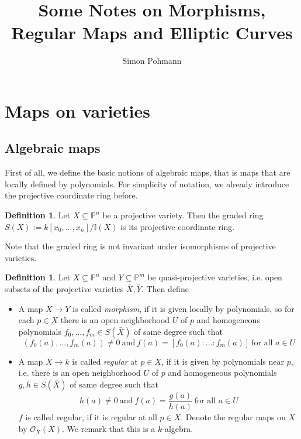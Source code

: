 \documentclass{scrartcl}
\title{Some Notes on Morphisms, Regular Maps and Elliptic Curves}
\author{Simon Pohmann}
\newcommand{\I}{\mathbb{I}}
\theoremstyle{definition}
\newtheorem{definition}[prop]{Definition}
\begin{document}
\maketitle

\tableofcontents

\section{Maps on varieties}

\subsection{Algebraic maps}
First of all, we define the basic notions of algebraic maps, that is maps that are locally defined by polynomials.
For simplicity of notation, we already introduce the projective coordinate ring before.
\begin{definition}
    Let $X \subseteq \mathbb{P}^n$ be a projective variety. 
    Then the graded ring $S(X) := k[x_0, ..., x_n] / \I(X)$ is its projective coordinate ring.
\end{definition}
Note that the graded ring is not invariant under isomorphisms of projective varieties.
\begin{definition}
    Let $X \subseteq \mathbb{P}^n$ and $Y \subseteq \mathbb{P}^m$ be quasi-projective varieties, i.e. open subsets of the projective varieties $\bar{X}, \bar{Y}$.
    Then define
    \begin{itemize}
        \item A map $X \to Y$ is called \emph{morphism}, if it is given locally by polynomials, so for each $p \in X$ there is an open neighborhood $U$ of $p$ and homogeneous polynomials $f_0, ..., f_m \in S(\bar{X})$ of same degree such that
        \begin{equation*}
            (f_0(a), ..., f_m(a)) \neq 0 \ \text{and} \ f(a) = [f_0(a) : ... : f_m(a)] \ \text{for all $a \in U$}
        \end{equation*}
        \item A map $X \to k$ is called \emph{regular} at $p \in X$, if it is given by polynomials near $p$, i.e. there is an open neighborhood $U$ of $p$ and homogeneous polynomials  $g, h \in S(\bar{X})$ of same degree such that
        \begin{equation*}
            h(a) \neq 0 \ \text{and} \ f(a) = \frac {g(a)} {h(a)} \ \text{for all $a \in U$}
        \end{equation*}
        $f$ is called regular, if it is regular at all $p \in X$. 
        Denote the regular maps on $X$ by $\mathcal{O}_{\bar{X}}(X)$.
        We remark that this is a $k$-algebra.
    \end{itemize}
\end{definition}
\end{document}
